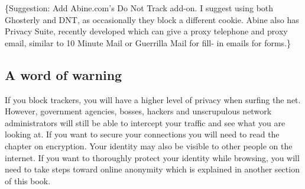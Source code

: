 \{Suggestion: Add Abine.com's Do Not Track add-on. I suggest using both
Ghosterly and DNT, as occasionally they block a different cookie. Abine
also has Privacy Suite, recently developed which can give a proxy
telephone and proxy email, similar to 10 Minute Mail or Guerrilla Mail
for fill- in emails for forms.\}

\subsection{A word of warning}

If you block trackers, you will have a higher level of privacy when
surfing the net. However, government agencies, bosses, hackers and
unscrupulous network administrators will still be able to intercept your
traffic and see what you are looking at. If you want to secure your
connections you will need to read the chapter on encryption. Your
identity may also be visible to other people on the internet. If you
want to thoroughly protect your identity while browsing, you will need
to take steps toward online anonymity which is explained in another
section of this book.
